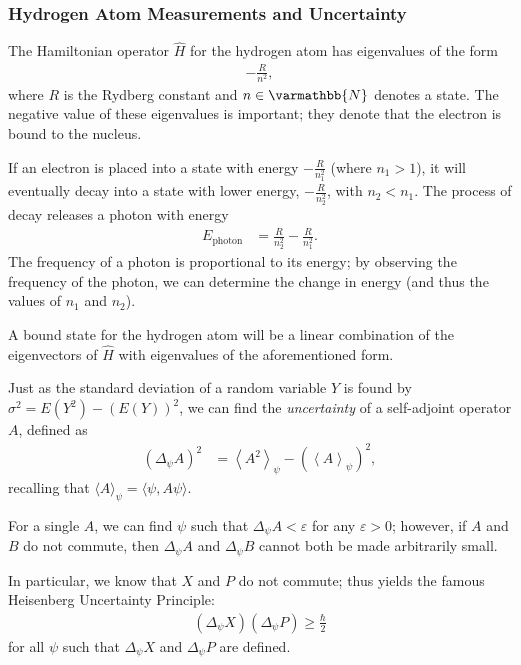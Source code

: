 \documentclass[12pt]{extarticle}
\newcommand{\N}{\varmathbb{N}}
\theoremstyle{plain}
\theoremstyle{definition}
\theoremstyle{remark}
\renewcommand{\newline}{\hfill\break}
\begin{document}
  \subsubsection{Hydrogen Atom Measurements and Uncertainty}%
  The Hamiltonian operator $\hat{H}$ for the hydrogen atom has eigenvalues of the form
  \begin{align*}
    -\frac{R}{n^2},
  \end{align*}
  where $R$ is the Rydberg constant and $n\in \N$ denotes a state. The negative value of these eigenvalues is important; they denote that the electron is bound to the nucleus.\newline

  If an electron is placed into a state with energy $-\frac{R}{n_1^2}$ (where $n_1 > 1$), it will eventually decay into a state with lower energy, $-\frac{R}{n_2^2}$, with $n_2 < n_1$. The process of decay releases a photon with energy
  \begin{align*}
    E_{\text{photon}} &= \frac{R}{n_2^2} - \frac{R}{n_1^2}.
  \end{align*}
  The frequency of a photon is proportional to its energy; by observing the frequency of the photon, we can determine the change in energy (and thus the values of $n_1$ and $n_2$).\newline

  A bound state for the hydrogen atom will be a linear combination of the eigenvectors of $\hat{H}$ with eigenvalues of the aforementioned form.\newline

  Just as the standard deviation of a random variable $Y$ is found by $\sigma^2 = E(Y^2) - \left(E(Y)\right)^2$, we can find the \textit{uncertainty} of a self-adjoint operator $A$, defined as
  \begin{align*}
    \left(\Delta_{\psi}A\right)^2 &= \left\langle A^2\right\rangle_{\psi} - \left(\left\langle A\right\rangle_{\psi}\right)^2,
  \end{align*}
  recalling that $\langle A \rangle_{\psi} = \langle \psi,A\psi\rangle$.\newline

  For a single $A$, we can find $\psi$ such that $\Delta_{\psi}A < \varepsilon$ for any $\varepsilon > 0$; however, if $A$ and $B$ do not commute, then $\Delta_{\psi}A$ and $\Delta_{\psi}B$ cannot both be made arbitrarily small.\newline

  In particular, we know that $X$ and $P$ do not commute; thus yields the famous Heisenberg Uncertainty Principle:
  \begin{align*}
    \left(\Delta_{\psi}X\right)\left(\Delta_{\psi}P\right) \geq \frac{\hbar}{2}
  \end{align*}
  for all $\psi$ such that $\Delta_{\psi}X$ and $\Delta_{\psi}P$ are defined.
\end{document}
